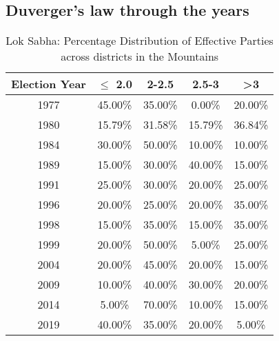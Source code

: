 \subsection{Duverger's law through the years}
\begin{table}[h]
\centering
\begin{tabular}{|c|c|c|c|c|}
\hline
Election Year & $\leq$ 2.0 & 2-2.5 & 2.5-3 & >3 \\ \hline
1977 & 45.00\% & 35.00\% & 0.00\% & 20.00\% \\ \hline
1980 & 15.79\% & 31.58\% & 15.79\% & 36.84\% \\ \hline
1984 & 30.00\% & 50.00\% & 10.00\% & 10.00\% \\ \hline
1989 & 15.00\% & 30.00\% & 40.00\% & 15.00\% \\ \hline
1991 & 25.00\% & 30.00\% & 20.00\% & 25.00\% \\ \hline
1996 & 20.00\% & 25.00\% & 20.00\% & 35.00\% \\ \hline
1998 & 15.00\% & 35.00\% & 15.00\% & 35.00\% \\ \hline
1999 & 20.00\% & 50.00\% & 5.00\% & 25.00\% \\ \hline
2004 & 20.00\% & 45.00\% & 20.00\% & 15.00\% \\ \hline
2009 & 10.00\% & 40.00\% & 30.00\% & 20.00\% \\ \hline
2014 & 5.00\% & 70.00\% & 10.00\% & 15.00\% \\ \hline
2019 & 40.00\% & 35.00\% & 20.00\% & 5.00\% \\ \hline

\end{tabular}
\caption{Lok Sabha: Percentage Distribution of Effective Parties  across districts in the Mountains}
\label{tab:mountain_percentage_district}
\end{table}

